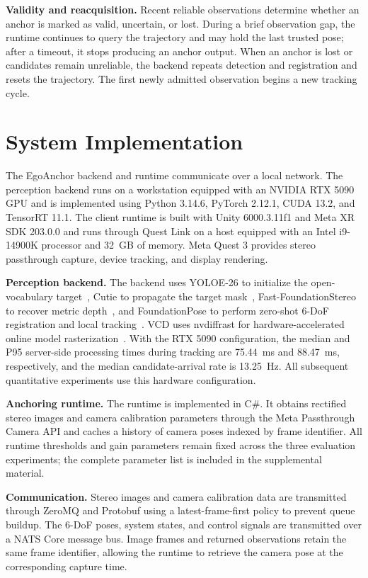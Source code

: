 \documentclass[review]{vgtc}
\begin{document}
\textbf{Validity and reacquisition.}\label{sec:validity}
Recent reliable observations determine whether an anchor is marked as valid, uncertain, or lost. During a brief observation gap, the runtime continues to query the trajectory and may hold the last trusted pose; after a timeout, it stops producing an anchor output. When an anchor is lost or candidates remain unreliable, the backend repeats detection and registration and resets the trajectory. The first newly admitted observation begins a new tracking cycle.

\section{System Implementation}\label{sec:implementation}

The EgoAnchor backend and runtime communicate over a local network. The perception backend runs on a workstation equipped with an NVIDIA RTX 5090 GPU and is implemented using Python 3.14.6, PyTorch 2.12.1, CUDA 13.2, and TensorRT 11.1. The client runtime is built with Unity 6000.3.11f1 and Meta XR SDK 203.0.0 and runs through Quest Link on a host equipped with an Intel i9-14900K processor and 32~GB of memory. Meta Quest 3 provides stereo passthrough capture, device tracking, and display rendering.

\textbf{Perception backend.}
The backend uses YOLOE-26 to initialize the open-vocabulary target~\cite{yoloe2025}, Cutie to propagate the target mask~\cite{cutie2024}, Fast-FoundationStereo to recover metric depth~\cite{fastfoundationstereo2026}, and FoundationPose to perform zero-shot 6-DoF registration and local tracking~\cite{foundationpose2024}. VCD uses nvdiffrast for hardware-accelerated online model rasterization~\cite{nvdiffrast2020}. With the RTX 5090 configuration, the median and P95 server-side processing times during tracking are 75.44~ms and 88.47~ms, respectively, and the median candidate-arrival rate is 13.25~Hz. All subsequent quantitative experiments use this hardware configuration.

\textbf{Anchoring runtime.}
The runtime is implemented in C\#. It obtains rectified stereo images and camera calibration parameters through the Meta Passthrough Camera API and caches a history of camera poses indexed by frame identifier. All runtime thresholds and gain parameters remain fixed across the three evaluation experiments; the complete parameter list is included in the supplemental material.

\textbf{Communication.}
Stereo images and camera calibration data are transmitted through ZeroMQ and Protobuf using a latest-frame-first policy to prevent queue buildup. The 6-DoF poses, system states, and control signals are transmitted over a NATS Core message bus. Image frames and returned observations retain the same frame identifier, allowing the runtime to retrieve the camera pose at the corresponding capture time.
\end{document}
